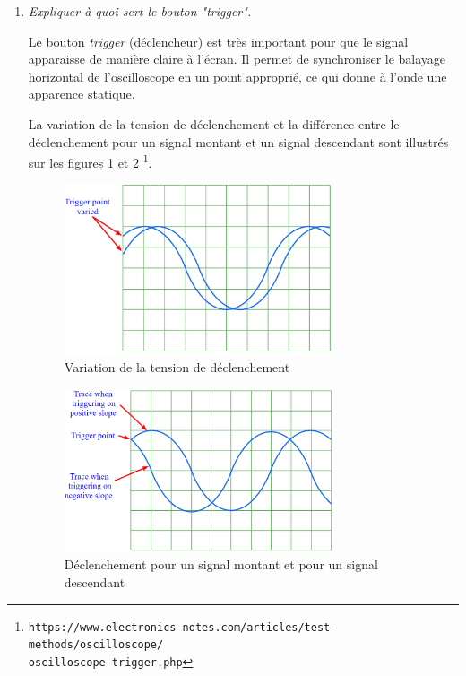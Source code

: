 \documentclass[a4paper]{article}
\begin{document}
\begin{enumerate}





\item \textit{Expliquer à quoi sert le bouton "trigger".}

  Le bouton \textit{trigger} (déclencheur) est très important pour que le signal apparaisse de manière claire à l'écran. Il permet de synchroniser le balayage horizontal de l'oscilloscope en un point approprié, ce qui donne à l'onde une apparence statique.

  La variation de la tension de déclenchement et la différence entre le déclenchement pour un signal montant et un signal descendant sont illustrés sur les figures \ref{fig:trigger01} et \ref{fig:trigger02} \footnote{\texttt{https://www.electronics-notes.com/articles/test-methods/oscilloscope/} \\ \texttt{oscilloscope-trigger.php}}.

\begin{figure}%
  \centering
  \includegraphics[width=0.75\textwidth]{trigger01.PNG}
  \caption{Variation de la tension de déclenchement}
  \label{fig:trigger01}
\end{figure}

\begin{figure}%
  \centering
  \includegraphics[width=0.75\textwidth]{trigger02.PNG}
  \caption{Déclenchement pour un signal montant et pour un signal descendant}
  \label{fig:trigger02}
\end{figure}






\end{enumerate}
\end{document}
